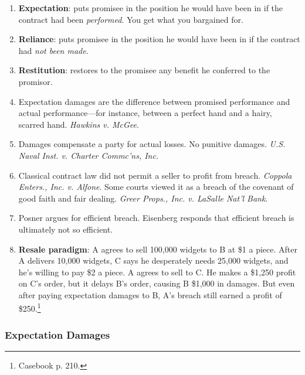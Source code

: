 \begin{enumerate}
    \item \textbf{Expectation}: puts promisee in the position he would have 
    been in if the contract had been \emph{performed}. You get what you 
    bargained for.
    \item \textbf{Reliance}: puts promisee in the position he would have been 
    in 
    if the contract had \emph{not been made}.
    \item \textbf{Restitution}: restores to the promisee any benefit he 
    conferred to the promisor.
    \item Expectation damages are the difference between promised performance 
    and actual performance---for instance, between a perfect hand and a hairy, 
    scarred hand. \emph{Hawkins v. McGee}.
    \item Damages compensate a party for actual losses. No punitive damages. 
    \emph{U.S. Naval Inst. v.  Charter Commc'ns, Inc.}
    \item Classical contract law did not permit a seller to profit from 
    breach. \emph{Coppola Enters., Inc. v. Alfone}. Some courts viewed it as a 
    breach of the covenant of good faith and fair dealing. \emph{Greer Props., 
    Inc. v. LaSalle Nat'l Bank}.
    \item Posner argues for efficient breach. Eisenberg responds that 
    efficient breach is ultimately not so efficient.
    \item \textbf{Resale paradigm}: A agrees to sell 100,000 widgets to B at 
    \$1 a piece. After A delivers 10,000 widgets, C says he desperately needs 
    25,000 widgets, and he's willing to pay \$2 a piece. A agrees to sell to 
    C. He makes a \$1,250 profit on C's order, but it delays B's order, 
    causing B \$1,000 in damages. But even after paying expectation damages to 
    B, A's breach still earned a profit of \$250.\footnote{Casebook p. 210.}
\end{enumerate}

\subsubsection{Expectation Damages}

